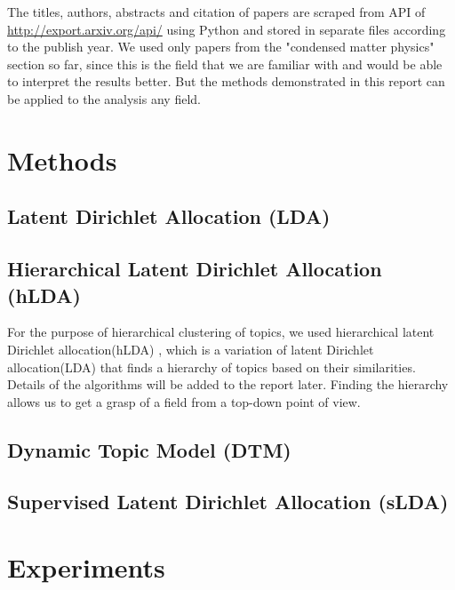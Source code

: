 \documentclass[DIV=calc, paper=a4, fontsize=11pt, twocolumn]{scrartcl}	 %
\begin{document}
The titles, authors, abstracts and citation of papers are scraped from API of \url{http://export.arxiv.org/api/} using Python and stored in separate files according to the publish year. We used only papers from the "condensed matter physics" section so far, since this is the field that we are familiar with and would be able to interpret the results better. But the methods demonstrated in this report can be applied to the analysis any field.

\section*{Methods}

\subsection*{Latent Dirichlet Allocation (LDA)}


\subsection*{Hierarchical Latent Dirichlet Allocation (hLDA)}
For the purpose of hierarchical clustering of topics, we used hierarchical latent Dirichlet allocation(hLDA) \cite{1}, which is a variation of latent Dirichlet allocation(LDA) \cite{2} that finds a hierarchy of topics based on their similarities. Details of the algorithms will be added to the report later. Finding the hierarchy allows us to get a grasp of a field from a top-down point of view. 

\subsection*{Dynamic Topic Model (DTM)}

\subsection*{Supervised Latent Dirichlet Allocation (sLDA)}

\section*{Experiments}
\end{document}
